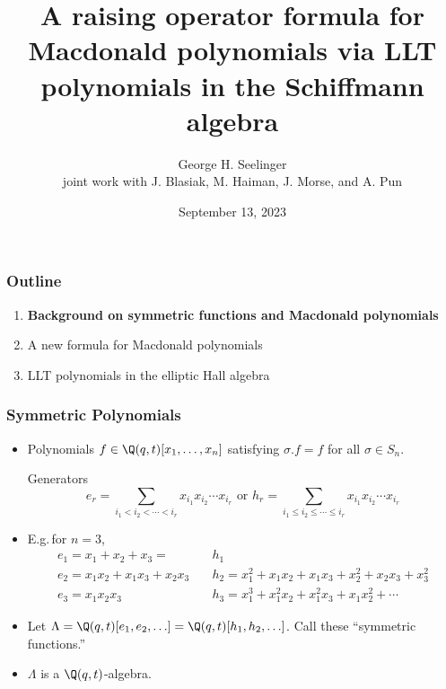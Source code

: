 \documentclass[dvipsnames]{beamer}
\title[Macdonald Catalanimals]{A raising operator formula for
  Macdonald polynomials via LLT polynomials in the Schiffmann algebra} %
\author[George H. Seelinger]{George H. Seelinger \\ joint work with
  J. Blasiak, M. Haiman, J. Morse, and A. Pun} %
\institute[UMich] %
{
ghseeli@umich.edu\\ %
\medskip
Purdue Mathematical Physics Seminar\\ %
\medskip
Based on arXiv:2112.07063 and arXiv:2307.06517
}
\date{September 13, 2023} %
\newcommand{\sym}{\Lambda}
\theoremstyle{definition}
\begin{document}
\begin{frame}
\titlepage %
\end{frame}
\begin{frame}
  \frametitle{Outline}
  \begin{enumerate}
  \item {\bf Background on symmetric functions and Macdonald polynomials}
  \item A new formula for Macdonald polynomials
  \item LLT polynomials in the elliptic Hall algebra
  \end{enumerate}
\end{frame}
\begin{frame}
  \frametitle{Symmetric Polynomials}
  \begin{itemize}
  \item Polynomials \(f \in \Q(q,t)[x_1,\ldots,x_n]\) satisfying \(\sigma.f
    = f\) for all \(\sigma \in S_n\).\pause
    \begin{block}{Generators}
    \[
      e_r =
      \sum_{i_1 < i_2 < \cdots < i_r} x_{i_1} x_{i_2} \cdots x_{i_r}
      \text { or }
      h_r = 
      \sum_{i_1 \leq i_2 \leq \cdots \leq i_r} x_{i_1} x_{i_2} \cdots x_{i_r}
    \]\pause 
  \end{block}
    \item E.g.\,for \(n=3\),
    \begin{align*}
      e_1 = x_1 + x_2 + x_3 = & h_1  \\
      e_2 = x_1 x_2 + x_1 x_3 + x_2 x_3 \quad & h_2 = x_1^2 + x_1 x_2 + x_1
                                          x_3 + x_2^2 +  x_2 x_3 +x_3^2  \\
      e_3 = x_1 x_2 x_3 \quad & h_3 = x_1^3 + x_1^2 x_2 + x_1^2 x_3 + x_1
                          x_2^2 + \cdots
    \end{align*} \pause
    \item Let \(\sym =
      \Q(q,t)[e_1,e_2,\ldots] = \Q(q,t)[h_1,h_2,\ldots]\). Call these
      ``symmetric functions.''\pause
    \item \(\sym\) is a \(\Q(q,t)\)-algebra.
  \end{itemize}
\end{frame}
\end{document}
